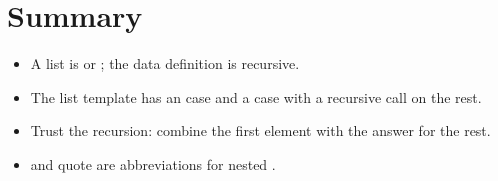 \section{Summary}
\begin{itemize}
  \item A list is  or ; the data definition is recursive.
  \item The list template has an  case and a  case with a recursive call on the rest.
  \item Trust the recursion: combine the first element with the answer for the rest.
  \item {} and quote are abbreviations for nested .
\end{itemize}
